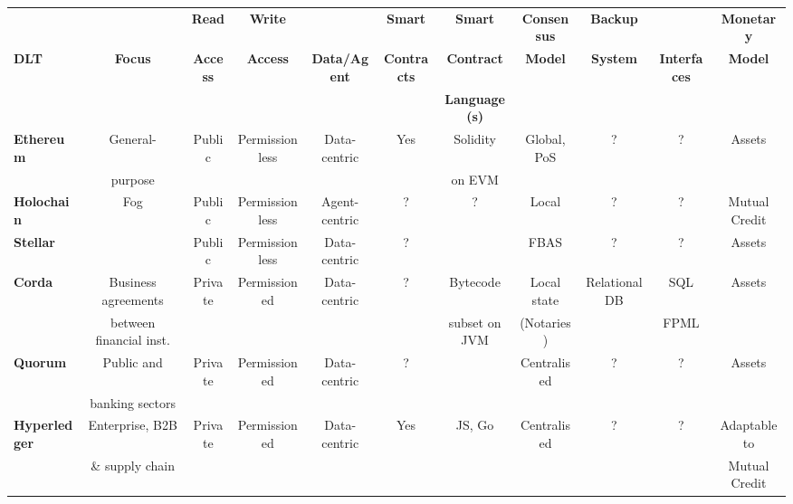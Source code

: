\begin{sidewaystable}
\small
\begin{centering}
{\begin{tabular}{| l | c | c | c | c | c | c | c | c | c | c |}
\hline
				& & \textbf{Read}  & \textbf{Write}  & \textbf{} 
				& \textbf{Smart} & \textbf{Smart}	&\textbf{Consensus}
				& \textbf{Backup} & \textbf{}	&\textbf{Monetary} \\
\textbf{DLT}		&\textbf{Focus}  & \textbf{Access} & \textbf{Access} & \textbf{Data/Agent} 
				& \textbf{Contracts} & \textbf{Contract}	&\textbf{Model} 
				& \textbf{System} & \textbf{Interfaces}	&\textbf{Model} \\
				& & \textbf{} & \textbf{} & \textbf{} 
				& \textbf{} & \textbf{Language(s)}	&\textbf{} 
				& \textbf{} & \textbf{}	&\textbf{} \\
\hline
\hline
\textbf{Ethereum}	&General- &Public		&Permissionless	&Data-centric	&Yes		&Solidity	
				&Global, PoS 		&?			&?		&Assets \\
				&purpose &				&			&		&			&on EVM	
				& 		&			&		& \\
\hline
\textbf{Holochain}	&Fog &Public		&Permissionless	&Agent-centric	&?		&?
				&Local 		&?				&?			&Mutual Credit\\
\hline
\textbf{Stellar}		& &Public		&Permissionless	&Data-centric	&?		&
				&FBAS 			&?				&?			&Assets\\
\hline
\textbf{Corda} 		&Business agreements&Private		&Permissioned		&Data-centric	&?		&Bytecode
				&Local state	&Relational DB		&SQL		&Assets\\
		 		&between financial inst.&			&				&			&		&subset on JVM
				&(Notaries)	&				&FPML			&\\
\hline
\textbf{Quorum} 	&Public and  &Private		&Permissioned		&Data-centric	&?		&
				&Centralised 	&?				&?			&Assets\\
			 	&banking sectors&		&		&	&		&
				& 	&				&			&\\
\hline
\textbf{Hyperledger}	&Enterprise, B2B	&Private		&Permissioned		&Data-centric	&Yes		&JS, Go
				&Centralised 	&?				&?			&Adaptable to\\
 				& \& supply chain	&			&				&			&		&
				& 			&				&			&Mutual Credit\\
\hline
\end{tabular}}

\vspace{1cm}


\end{centering}
\end{sidewaystable}
